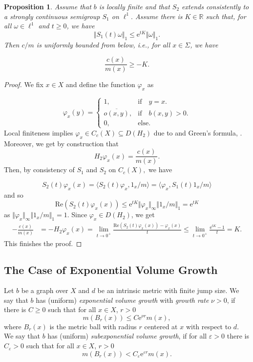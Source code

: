 \documentclass[10pt]{amsart}
\newtheorem{proposition}[theorem]{Proposition}
\theoremstyle{definition}
\begin{document}
\begin{proposition}\label{lowerboundpotential}
    Assume that $b$ is locally finite and that $S_2$ extends consistently to a strongly continuous semigroup $S_1$ on $\ell^1.$ Assume there is $K\in\mathbb{R}$ such that, for all $\omega\in\ell^1$ and $t\geq 0$, we have
    \[\Vert S_1(t)\omega\Vert_1\leq \mathrm{e}^{tK}\Vert\omega\Vert_1.\] Then $c\slash m$ is uniformly bounded from below, i.e., for all $x\in\Sigma$, we have
    
    \[\frac{c(x)}{m(x)}\geq -K.\]
\end{proposition}
\begin{proof}
    We fix $x\in X$ and define the function $\varphi_x$ as 

    \begin{equation*}
        \varphi_x(y) = \begin{cases}
            1, &\text{if}\quad y = x.\\
           \overline{ o(x,y)}, & \text{if}\quad b(x,y)>0. \\
            0,&\text{else}.
        \end{cases}
    \end{equation*}
    Local finiteness implies $\varphi_x\in C_c(X)\subseteq D(H_2)$ due to \cite[Lemma~2.11]{GKS} and Green's formula, \cite[Lemma~2.1]{GKS}. Moreover, we get by construction that \[H_2\varphi_x(x) = \frac{c(x)}{m(x)}.\]
    Then, by consistency of $S_1$ and $S_2$ on $C_c(X),$ we have
    
        \[S_2(t)\varphi_x(x) = \langle S_2(t)\varphi_x,1_x\slash m\rangle =  \langle \varphi_x,S_1(t)1_x\slash m\rangle\] and so \[\mathrm{Re}(S_2(t)\varphi_x(x))\leq \mathrm{e}^{tK}\Vert\varphi_x\Vert_\infty\Vert1_x\slash m\Vert_1=\mathrm{e}^{tK}\]
        as $\Vert\varphi_x\Vert_\infty\Vert1_x\slash m\Vert_1=1$.
    Since $\varphi_x\in D(H_2)$, we get 
    \begin{align*}
        -\frac{c(x)}{m(x)} & = -H_2\varphi_x(x) = \lim_{t\rightarrow 0^+}\frac{\mathrm{Re}(S_2(t)\varphi_x(x))-\varphi_x(x)}{t}\leq \lim_{t\rightarrow 0^+}\frac{\mathrm{e}^{tK}-1}{t} = K.
    \end{align*}This finishes the proof.
\end{proof}


\subsection{The Case of Exponential Volume Growth}\label{sectionVolGrowth}
Let $b$ be a graph over $X$ and $d$ be an intrinsic metric with finite jump size.
We say that $b$ has (uniform) \textit{exponential volume growth} with \textit{growth rate} $\nu>0$, if there is $C\ge 0$ such that for all $x\in X$,  $r>0$ \[m(B_r(x))\leq C\mathrm{e}^{\nu r}m(x),\] where $B_r(x)$ is the metric ball with radius $r$ centered at $x$ with respect to $d.$   We say that $b$ has (uniform) \textit{subexponential volume growth}, if for all $\varepsilon>0$ there is $C_\varepsilon>0$ such that for all $x\in X$,    $r>0$
\[m(B_r(x))<C_\varepsilon\mathrm{e}^{\varepsilon r}m(x).\]
\end{document}
